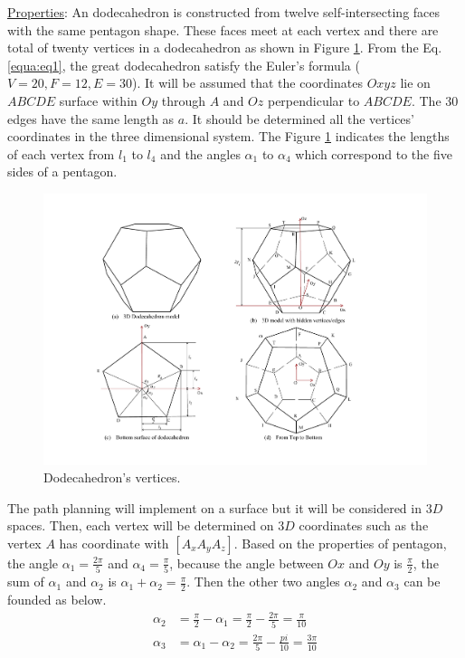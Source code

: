 \noindent\uline{Properties}: 
An dodecahedron is constructed from twelve self-intersecting faces with the same pentagon shape. These faces meet at each vertex and there are total of twenty vertices in a dodecahedron as shown in Figure \ref{fig:dodecahedron2}.
%
From the Eq. \ref{equa:eq1}, the great dodecahedron satisfy the Euler's formula ($V=20, F=12, E=30$).
%
It will be assumed that the coordinates $Oxyz$ lie on $ABCDE$ surface within $Oy$ through $A$ and $Oz$ perpendicular to $ABCDE$.
%
The 30 edges have the same length as $a$. It should be determined all the vertices' coordinates in the three dimensional system.
%
The Figure \ref{fig:dodecahedron2} indicates the lengths of each vertex from $l_1$ to $l_4$ and the angles $\alpha_1$ to $\alpha_4$ which correspond to the five sides of a pentagon.

\begin{figure}[h]
\centering
	\includegraphics[width=1\textwidth]{image/dodecahedron2.pdf}
	\caption{Dodecahedron's vertices.}
	\label{fig:dodecahedron2}
\end{figure}

\noindent The path planning will implement on a surface but it will be considered in $3D$ spaces. 
Then, each vertex will be determined on $3D$ coordinates such as the vertex $A$ has coordinate with $[A_x A_y A_z]$. 
Based on the properties of pentagon, the angle $\alpha_1=\frac{2\pi}{5}$ and $\alpha_4=\frac{\pi}{5}$, 
because the angle between $Ox$ and $Oy$ is $\frac{\pi}{2}$, the sum of $\alpha_1$ and $\alpha_2$ is $\alpha_1 + \alpha_2 = \frac{\pi}{2}$. 
Then the other two angles $\alpha_2$ and $\alpha_3$ can be founded as below. 
\begin{equation*} 
\label{equa:eq0}
\begin{split}
\alpha_2 &= \frac{\pi}{2}-\alpha_1 = \frac{\pi}{2}-\frac{2\pi}{5} = \frac{\pi}{10}\\ 
\alpha_3 &= \alpha_1-\alpha_2 = \frac{2\pi}{5}-\frac{pi}{10} = \frac{3\pi}{10}
\end{split}
\end{equation*}

